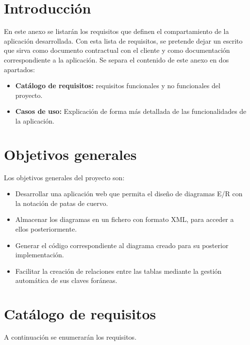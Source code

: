 
\section{Introducción}
En este anexo se listarán los requisitos que definen el compartamiento de la aplicación desarrollada. Con esta lista de requisitos, se pretende dejar un escrito que sirva como documento contractual con el cliente y como documentación correspondiente a la aplicación.
Se separa el contenido de este anexo en dos apartados:
\begin{itemize}
    \item \textbf{Catálogo de requisitos: } requisitos funcionales y no funcionales del proyecto.
    \item \textbf{Casos de uso: }Explicación de forma más detallada de las funcionalidades de la aplicación.
\end{itemize}

\section{Objetivos generales}
Los objetivos generales del proyecto son:
\begin{itemize}
    \item Desarrollar una aplicación web que permita el diseño de diagramas E/R con la notación de patas de cuervo.
    \item Almacenar los diagramas en un fichero con formato XML, para acceder a ellos posteriormente.
    \item Generar el código correspondiente al diagrama creado para su posterior implementación.
    \item Facilitar la creación de relaciones entre las tablas mediante la gestión automática de sus claves foráneas.
\end{itemize}

\section{Catálogo de requisitos}
A continuación se enumerarán los requisitos.

